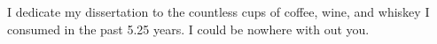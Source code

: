 \begin{dedication}

\bigskip

${}$ \\

\bigskip

${}$ \\

\bigskip

${}$ \\

\bigskip

\begin{center}
\begin{Large}

I dedicate my dissertation to the countless cups of coffee, wine, and whiskey I consumed in the past 5.25 years. I could be nowhere with out you.

\end{Large}
\end{center}


\end{dedication} 